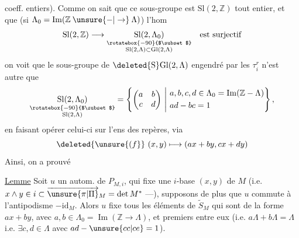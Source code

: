 coeff. entiers). Comme on sait que ce sous-groupe est $\mathrm{Sl}(2,\mathbb Z)$ tout entier, et que (si $\Lambda_0=\operatorname{Im}(\mathbb Z\mathbin{\unsure{-|\to}}\Lambda)$)  l'hom
\[
 \mathrm{Sl}(2,\mathbb Z)\longrightarrow
 \underset{\substack{\rotatebox{-90}{$\subset$}\\\mathrm{Sl}(2,\Lambda)\subset\mathrm{Gl}(2,\Lambda)}}{\mathrm{Sl}(2,\Lambda_0)}
 \quad\text{est surjectif}
\]
on voit que le sous-groupe de $\mathrm{\deleted{S}Gl}(2,\Lambda)$ engendré par les $\tau_i^{r}$ n'est autre que  \unsure{/}
\[
 \underset{\substack{\rotatebox{-90}{$\subset$}\\\mathrm{Sl}(2,\Lambda)}}{\mathrm{Sl}(2,\Lambda_0)}
 =\left\{\begin{pmatrix}a&b\\c&d\end{pmatrix}\ \middle|\
 \begin{aligned}&a,b,c,d\in\Lambda_0=\operatorname{Im}(\mathbb Z\mathbin{-}\Lambda)\\&ad-bc=1\end{aligned}\right\},
\]
en faisant opérer celui-ci  sur l'ens des repères, via
\[
 \deleted{\unsure{(f}}\ (x,y)\longmapsto(ax+by,cx+dy)
\]
Ainsi, on a prouvé

\uline{Lemme} Soit $u$ un autom. de $P_{M,i}$, qui fixe  une $i$-base $(x,y)$ de $M$ (i.e. $x\wedge y\in i\subset\overrightarrow{\unsure{\pi|\Pi}}_M=\det M^*$ ---),  supposons de plus que $u$ commute à l'antipodisme $-\mathrm{id}_M$. Alors $u$ fixe  tous les éléments de $\widetilde S_M$ qui sont de la forme $ax+by$, avec $a,b\in\Lambda_0=\operatorname{Im}(\mathbb Z\to\Lambda)$, et premiers  entre eux (i.e. $a\Lambda+b\Lambda=\Lambda$ i.e. $\exists c,d\in\Lambda$ avec $ad-\unsure{cc|ce}=1$).
